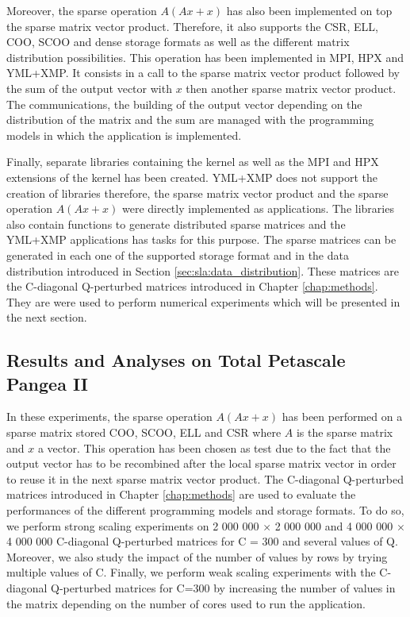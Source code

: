 Moreover, the sparse operation $A(Ax+x)$ has also been implemented on top the sparse matrix vector product.
Therefore, it also supports the CSR, ELL, COO, SCOO and dense storage formats as well as the different matrix distribution possibilities.
This operation has been implemented in MPI, HPX and YML+XMP.
It consists in a call to the sparse matrix vector product followed by the sum of the output vector with $x$ then another sparse matrix vector product.
The communications, the building of the output vector depending on the distribution of the matrix and the sum are managed with the programming models in which the application is implemented.

Finally, separate libraries containing the kernel as well as the MPI and HPX extensions of the kernel has been created.
YML+XMP does not support the creation of libraries therefore, the sparse matrix vector product and the sparse operation $A(Ax+x)$ were directly implemented as applications.
The libraries also contain functions to generate distributed sparse matrices and the YML+XMP applications has tasks for this purpose.
The sparse matrices can be generated in each one of the supported storage format and in the data distribution introduced in Section \ref{sec:sla:data_distribution}.
These matrices are the C-diagonal Q-perturbed matrices introduced in Chapter \ref{chap:methods}.
They are were used to perform numerical experiments which will be presented in the next section.


\subsection{Results and Analyses on Total Petascale Pangea II}
In these experiments, the sparse operation $A(Ax+x)$ has been performed on a sparse matrix stored COO, SCOO, ELL and CSR where $A$ is the sparse matrix and $x$ a vector.
This operation has been chosen as test due to the fact that the output vector has to be recombined after the local sparse matrix vector in order to reuse it in the next sparse matrix vector product.
The C-diagonal Q-perturbed matrices introduced in Chapter \ref{chap:methods} are used to evaluate the performances of the different programming models and storage formats.
To do so, we perform strong scaling experiments on 2 000 000 $\times$ 2 000 000 and 4 000 000 $\times$ 4 000 000 C-diagonal Q-perturbed matrices for C = 300 and several values of Q.
Moreover, we also study the impact of the number of values by rows by trying multiple values of C.
Finally, we perform weak scaling experiments with the C-diagonal Q-perturbed matrices for C=300 by increasing the number of values in the matrix depending on the number of cores used to run the application.

